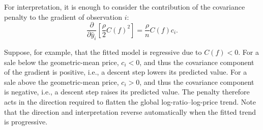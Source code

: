 \documentclass[10pt]{article}
\theoremstyle{definition}
\newcommand{\1}{\mathbf{1}}
\begin{document}


{For interpretation, it is enough to consider the contribution of the covariance penalty to the gradient of observation $i$:}
{
\begin{equation}
\label{eq:direct_penalty_gradient}
\frac{\partial}{\partial \widehat y_i}
\left[
\frac{\rho}{2}C(f)^2
\right]
=
\frac{\rho}{n}C(f)c_i.
\end{equation}
}




{Suppose, for example, that the fitted model is regressive due to $C(f)<0$. For a sale below the geometric-mean price, $c_i<0$, and thus the covariance component of the gradient is positive, i.e., a descent step lowers its predicted value. For a sale above the geometric-mean price, $c_i>0$, and thus the covariance component is negative, i.e., a descent step raises its predicted value. The penalty therefore acts in the direction required to flatten the global log-ratio--log-price trend. Note that the direction and interpretation reverse automatically when the fitted trend is progressive.}
\end{document}
